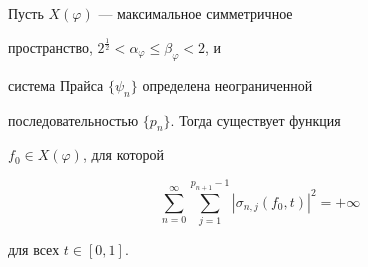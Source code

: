 \begin{thm}


Пусть $X(\varphi)$ --- максимальное симметричное 


пространство, $2^{\frac{1}{2}}<\alpha_{\varphi}\leq\beta_{\varphi}<2$, и 


система Прайса $\{\psi_{n}\}$ определена неограниченной 


последовательностью $\{p_{n}\}$. Тогда существует функция 


$f_{0}\in X(\varphi)$, для которой


$$ 


\sum_{n=0}^{\infty} 


\sum_{j=1}^{p_{n+1}-1}|\sigma_{n,j}(f_{0},t)|^{2}=+\infty


$$


для всех $t\in[0,1]$. 


\end{thm}





